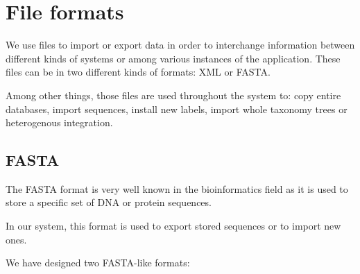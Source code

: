 \section{File formats} \label{sec:file_formats}


We use files to import or export data in order to interchange information between different kinds of systems or among various instances of the application. These files can be in two different kinds of formats: XML or FASTA.

Among other things, those files are used throughout the system to: copy entire databases, import sequences, install new labels, import whole taxonomy trees or heterogenous integration. 
 
\subsection{FASTA}

The FASTA format \cite{fasta} is very well known in the bioinformatics field as it is used to store a specific set of DNA or protein sequences.

In our system, this format is used to export stored sequences or to import new ones.

We have designed two FASTA-like formats:

